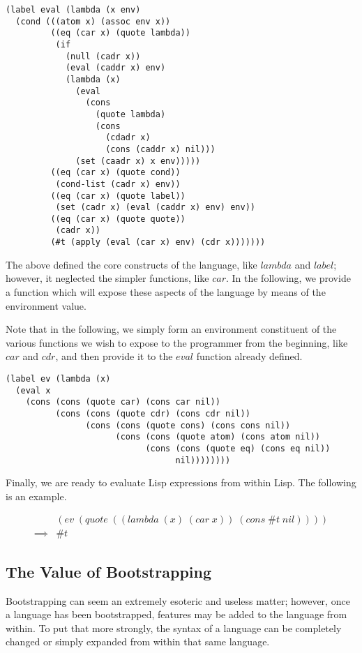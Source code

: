 \documentclass{article}
\begin{document}
\begin{verbatim}
(label eval (lambda (x env)
  (cond (((atom x) (assoc env x))
         ((eq (car x) (quote lambda)) 
          (if
            (null (cadr x))
            (eval (caddr x) env)
            (lambda (x) 
              (eval 
                (cons 
                  (quote lambda) 
                  (cons 
                    (cdadr x) 
                    (cons (caddr x) nil))) 
              (set (caadr x) x env)))))
         ((eq (car x) (quote cond))
          (cond-list (cadr x) env))
         ((eq (car x) (quote label))
          (set (cadr x) (eval (caddr x) env) env))
         ((eq (car x) (quote quote))
          (cadr x))
         (#t (apply (eval (car x) env) (cdr x)))))))
\end{verbatim}

The above defined the core constructs of the language, like $lambda$ and $label$; however, it neglected
the simpler functions, like $car$. In the following, we provide a function which will expose these
aspects of the language by means of the environment value.

Note that in the following, we simply form an environment constituent of the various functions we wish
to expose to the programmer from the beginning, like $car$ and $cdr$, and then provide it to the $eval$
function already defined.

\begin{verbatim}
(label ev (lambda (x)
  (eval x 
    (cons (cons (quote car) (cons car nil))
          (cons (cons (quote cdr) (cons cdr nil))
                (cons (cons (quote cons) (cons cons nil))
                      (cons (cons (quote atom) (cons atom nil))
                            (cons (cons (quote eq) (cons eq nil))
                                  nil))))))))
\end{verbatim}

Finally, we are ready to evaluate Lisp expressions from within Lisp. The following is an example.

\begin{align*}
   &(ev \; (quote \; ((lambda \; (x) \; (car \; x)) \; (cons \; \#t \; nil))))
\\ \implies & \#t   
\end{align*}

\subsection{The Value of Bootstrapping}
Bootstrapping can seem an extremely esoteric and useless matter; however, once a language has been
bootstrapped, features may be added to the language from within. To put that more strongly, the
syntax of a language can be completely changed or simply expanded from within that same language. 
\end{document}
